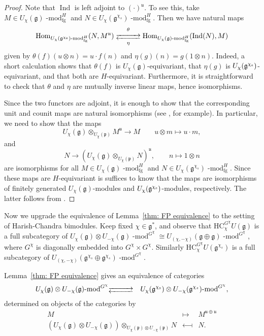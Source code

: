 \documentclass[twoside,12pt,reqno]{amsart}
\newcommand{\myrightleftarrows}[1]{\mathrel{\substack{\xrightarrow{#1} \\[-.9ex] \xleftarrow{#1}}}}
\theoremstyle{remark}
\numberwithin{equation}{section}
\def\rs{{\mathrm s}}
\def\lmod{\!\operatorname{-mod}}
\def\Ind{\operatorname{Ind}}
\def\Hom{\operatorname{Hom}}
\def\HC{\mathrm{HC}}
\def\g{{\mathfrak g}}
\def\p{\mathfrak p}
\def\u{\mathfrak{u}}
\newcommand{\fg}{\operatorname{fg}}
\renewcommand{\rs}{{\rm s}}
\begin{document}
\begin{proof}
    Note that $\Ind$ is left adjoint to $(\cdot)^\u$.
    To see this, take $M \in U_\chi(\g)\lmod^H_{\fg}$ and $N \in U_\chi(\g^{\chi_s})\lmod^H_{\fg}$.
Then we have natural maps 
\begin{equation}
    \label{eq:refme}
    \Hom_{U_\chi(\g^{\chi_\rs})\lmod^H_{\fg}}(N, M^\u) \underset{\eta}{\overset{\theta}{\myrightleftarrows{\rule{1cm}{0cm}}}} \Hom_{U_\chi(\g)\lmod^H_{\fg}}(\Ind(N), M) 
\end{equation}
given by $\theta(f) (u \otimes n) = u \cdot f(n)$ and $\eta(g)(n) = g(1 \otimes n)$. Indeed, a short calculation shows that $\theta(f)$ is $U_\chi(\g)$-equivariant, that $\eta(g)$ is $U_\chi(\g^{\chi_\rs})$-equivariant, and that both are $H$-equivariant. Furthermore, it is straightforward to check that $\theta$ and $\eta$ are mutually inverse linear maps, hence isomorphisms.

    Since the two functors are adjoint, it is enough to show that the corresponding unit and counit maps are natural isomorphisms (see \cite[IV.4 Theorem 1]{MacLane}, for example).  In particular, we need to show that the maps
    \begin{equation*}
        U_\chi(\g) \otimes_{U_\chi(\p)} M^\u \to M \qquad u \otimes m \mapsto u \cdot m,
    \end{equation*}
    and
    \begin{equation*}
        N \to (U_\chi(\g) \otimes_{U_\chi(\p)} N)^\u, \qquad n \mapsto 1 \otimes n
    \end{equation*}
    are isomorphisms for all $M \in U_\chi(\g)\lmod^H_{\fg}$ and $N \in U_\chi(\g^{\chi_s})\lmod^H_{\fg}$. Since these maps are $H$-equivariant is suffices to know that the maps are isomorphisms of finitely generated $U_\chi(\g)$-modules and $U_\chi(\g^{\chi_\rs})$-modules, respectively. The latter follows from \cite[Theorem~3.2]{FP}.
\end{proof}

Now we upgrade the equivalence of Lemma~\ref{thm: FP equivalence} to the setting of Harish-Chandra bimodules. Keep fixed $\chi \in \g^*$, and observe that $\HC_\chi^{G^\chi} U(\g)$ is a full subcategory of $U_\chi (\g) \otimes U_{-\chi}(\g) \lmod^{G^\chi} \cong U_{(\chi, -\chi)} (\g \oplus \g) \lmod^{G^\chi}$, where $G^\chi$ is diagonally embedded into $G^\chi \times G^\chi$. Similarly $\HC^{G^\chi}_{\chi} U(\g^{\chi_s})$ is a full subcategory of $U_{(\chi, -\chi)} (\g^{\chi_s} \oplus \g^{\chi_s}) \lmod^{G^\chi}$.

Lemma~\ref{thm: FP equivalence} gives an equivalence of categories
\begin{eqnarray}
    \label{eq:consequentequivalence}
    U_\chi (\g) \otimes U_{-\chi}(\g) \lmod^{G^\chi} & {\myrightleftarrows{\rule{1cm}{0cm}}} & U_{\chi} (\g^{\chi_\rs}) \otimes U_{-\chi}(\g^{\chi_s}) \lmod^{G^\chi},
\end{eqnarray}
determined on objects of the categories by
    \begin{eqnarray*}
            M & \longmapsto & M^{\u \oplus \u}\\
    (U_\chi(\g) \otimes U_{-\chi}(\g))\otimes_{U_{\chi}(\p) \otimes U_{-\chi}(\p)} N & \longmapsfrom & N.
    \end{eqnarray*}
 
\end{document}
